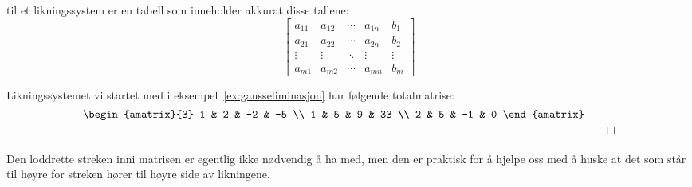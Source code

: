  til et likningssystem er en tabell som
inneholder akkurat disse tallene:
\[
\left[
\begin{array}{cccc|c}
  a_{11} & a_{12} & \cdots & a_{1n} & b_1 \\
  a_{21} & a_{22} & \cdots & a_{2n} & b_2 \\
  \vdots & \vdots & \ddots & \vdots & \vdots \\
  a_{m1} & a_{m2} & \cdots & a_{mn} & b_m
\end{array}
\right]
\]

\begin{ex}
Likningssystemet vi startet med i eksempel~\ref{ex:gausseliminasjon}
har følgende totalmatrise:
\[
\raisebox{15pt}{$
\begin{amatrix}{3}
1 & 2 & -2 & -5 \\
1 & 5 &  9 & 33 \\
2 & 5 & -1 & 0
\end{amatrix}
$}\qedhere
\]
\end{ex}

Den loddrette streken inni matrisen er egentlig ikke nødvendig å ha
med, men den er praktisk for å hjelpe oss med å huske at det som står
til høyre for streken hører til høyre side av likningene.


